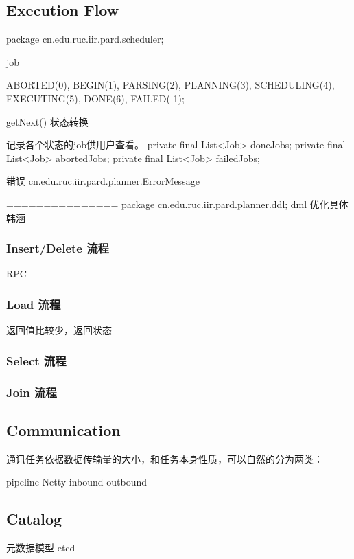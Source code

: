 \documentclass[a4paper, 12pt]{ctexart}
\begin{document}
\subsection{Execution Flow}
package cn.edu.ruc.iir.pard.scheduler;

job 

ABORTED(0), BEGIN(1), PARSING(2), PLANNING(3), SCHEDULING(4), EXECUTING(5), DONE(6), FAILED(-1);


getNext() 状态转换



记录各个状态的job供用户查看。
private final List<Job> doneJobs;
private final List<Job> abortedJobs;
private final List<Job> failedJobs;


错误
cn.edu.ruc.iir.pard.planner.ErrorMessage



=============== 
package cn.edu.ruc.iir.pard.planner.ddl;
dml  优化具体 韩涵

\subsubsection{Insert/Delete 流程}
RPC

\subsubsection{Load 流程}
返回值比较少，返回状态

\subsubsection{Select 流程}


\subsubsection{Join 流程}



\subsection{Communication}
通讯任务依据数据传输量的大小，和任务本身性质，可以自然的分为两类：


pipeline  Netty inbound outbound



\subsection{Catalog}
元数据模型  etcd   
\end{document}
